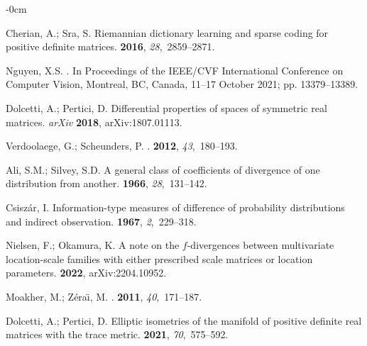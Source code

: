 \documentclass[entropy,article,accept,oneauthor,pdftex,entropy]{Definitions/mdpi}
\begin{document}
\begin{adjustwidth}{-\extralength}{0cm}
\begin{thebibliography}{999}
Cherian, A.; Sra, S.
\newblock Riemannian dictionary learning and sparse coding for positive
  definite matrices.
 {\bf
  2016}, {\em 28},~2859--2871.

Nguyen, X.S.
.
\newblock In Proceedings of the IEEE/CVF International
  Conference on Computer Vision, {Montreal, BC, Canada, 11--17 October 2021}; pp. 13379--13389.

Dolcetti, A.; Pertici, D.
\newblock Differential properties of spaces of symmetric real matrices.
\emph{arXiv} \textbf{2018}, arXiv:1807.01113.

Verdoolaege, G.; Scheunders, P.
.
 {\bf 2012}, {\em
  43},~180--193.

Ali, S.M.; Silvey, S.D.
\newblock A general class of coefficients of divergence of one distribution
  from another.
 {\bf 1966}, {\em 28},~131--142.

Csisz{\'a}r, I.
\newblock Information-type measures of difference of probability distributions
  and indirect observation.
 {\bf 1967}, {\em
  2},~229--318.

Nielsen, F.; Okamura, K.
\newblock A note on the $f$-divergences between multivariate location-scale
  families with either prescribed scale matrices or location parameters.
 {\bf 2022}, arXiv:2204.10952.

Moakher, M.; Z{\'e}ra{\"\i}, M.
.
 {\bf 2011}, {\em
  40},~171--187.

Dolcetti, A.; Pertici, D.
\newblock Elliptic isometries of the manifold of positive definite real
  matrices with the trace metric.
 {\bf
  2021}, {\em 70},~575--592.


\end{thebibliography}
\end{adjustwidth}
\end{document}
